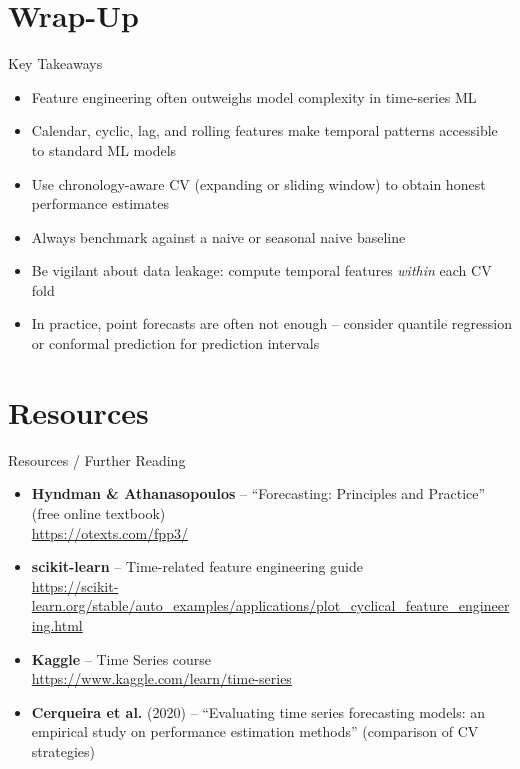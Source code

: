 \documentclass[11pt,compress,t,notes=noshow, xcolor=table]{beamer}
\begin{document}
\section{Wrap-Up}
\begin{vbframe}{Key Takeaways}
  \vfill
  \begin{itemize}
    \item Feature engineering often outweighs model complexity in time-series ML
    \item Calendar, cyclic, lag, and rolling features make temporal patterns accessible to standard ML models
    \item Use chronology-aware CV (expanding or sliding window) to obtain honest performance estimates
    \item Always benchmark against a naive or seasonal naive baseline
    \item Be vigilant about data leakage: compute temporal features \emph{within} each CV fold
    \item In practice, point forecasts are often not enough -- consider quantile regression or conformal prediction for prediction intervals
  \end{itemize}
  \vfill
\end{vbframe}

\section{Resources}
\begin{vbframe}{Resources / Further Reading}
\vfill
\begin{itemize}
    \item \textbf{Hyndman \& Athanasopoulos} -- ``Forecasting: Principles and Practice'' (free online textbook)\\
    \url{https://otexts.com/fpp3/}
    \item \textbf{scikit-learn} -- Time-related feature engineering guide\\
    \url{https://scikit-learn.org/stable/auto_examples/applications/plot_cyclical_feature_engineering.html}
    \item \textbf{Kaggle} -- Time Series course\\
    \url{https://www.kaggle.com/learn/time-series}
    \item \textbf{Cerqueira et al.} (2020) -- ``Evaluating time series forecasting models: an empirical study on performance estimation methods'' (comparison of CV strategies)
\end{itemize}
\vfill
\end{vbframe}
\end{document}
